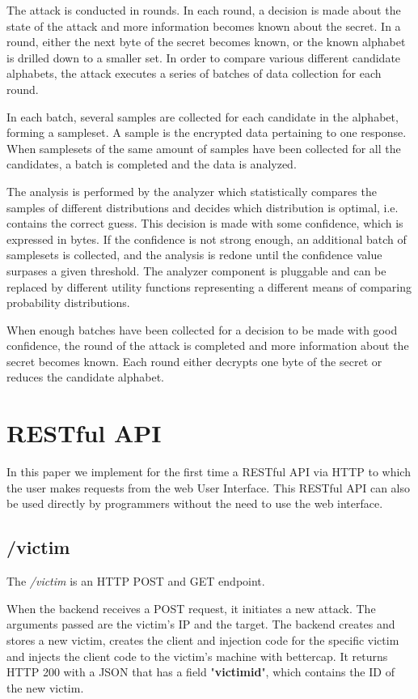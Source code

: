 \documentclass[a4paper, 11 pt, conference]{article}
\begin{document}
The attack is conducted in rounds. In each round, a decision is made about the state of the attack and more information becomes known about the secret. In a round, either the next byte of the secret becomes known, or the known alphabet is drilled down to a smaller set. In order to compare various different candidate alphabets, the attack executes a series of batches of data collection for each round.

In each batch, several samples are collected for each candidate in the alphabet, forming a sampleset. A sample is the encrypted data pertaining to one response. When samplesets of the same amount of samples have been collected for all the candidates, a batch is completed and the data is analyzed. 

The analysis is performed by the analyzer which statistically compares the samples of different distributions and decides which distribution is optimal, i.e. contains the correct guess. This decision is made with some confidence, which is expressed in bytes. If the confidence is not strong enough, an additional batch of samplesets is collected, and the analysis is redone until the confidence value surpases a given threshold. The analyzer component is pluggable and can be replaced by different utility functions representing a different means of comparing probability distributions.

When enough batches have been collected for a decision to be made with good confidence, the round of the attack is completed and more information about the secret becomes known. Each round either decrypts one byte of the secret or reduces the candidate alphabet.

\section{RESTful API}

In this paper we implement for the first time a RESTful API via HTTP to which the user makes requests from the web User Interface. This RESTful API can also be used directly by programmers without the need to use the web interface.

\subsection{/victim}

The \textit{/victim} is an HTTP POST and GET endpoint. 

When the backend receives a POST request, it initiates a new attack. The arguments passed are the victim's IP and the target.  The backend creates and stores a new victim, creates the client and injection code for the specific victim and injects the client code to the victim's machine with bettercap. It returns HTTP 200 with a JSON that has a field "\textbf{victimid}", which contains the ID of the new victim.
\end{document}
